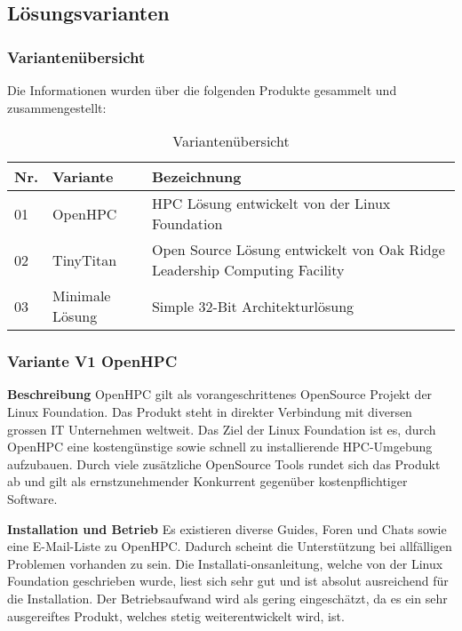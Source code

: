 
\subsection{Lösungsvarianten}
\subsubsection{Variantenübersicht}

Die Informationen wurden über die folgenden Produkte gesammelt und zusammengestellt:

\begin{table}[H]
\centering
\begin{tabular}{p{1cm}p{4cm}p{11cm}}
\hline
\rowcolor{heading} \textbf{Nr.} & \textbf{Variante} & \textbf{Bezeichnung} \\\hline
01 & OpenHPC & HPC Lösung entwickelt von der Linux Foundation \\\hline
02 & TinyTitan & Open Source Lösung entwickelt von Oak Ridge Leadership Computing Facility \\\hline
03 & Minimale Lösung & Simple 32-Bit Architekturlösung \\\hline
\end{tabular}
\caption{Variantenübersicht}
\end{table}

\subsubsection{Variante V1 \flqq OpenHPC\frqq}

\textbf{Beschreibung}\newline
OpenHPC gilt als vorangeschrittenes OpenSource Projekt der Linux Foundation. Das Produkt steht in direkter Verbindung mit diversen grossen IT Unternehmen weltweit. Das Ziel der Linux Foundation ist es, durch OpenHPC eine kostengünstige sowie schnell zu installierende HPC-Umgebung aufzubauen. Durch viele zusätzliche OpenSource Tools rundet sich das Produkt ab und gilt als ernstzunehmender Konkurrent gegenüber kostenpflichtiger Software.

\textbf{Installation und Betrieb}\newline
Es existieren diverse Guides, Foren und Chats sowie eine E-Mail-Liste zu OpenHPC. Dadurch scheint die Unterstützung bei allfälligen Problemen vorhanden zu sein. Die Installati-onsanleitung, welche von der Linux Foundation geschrieben wurde, liest sich sehr gut und ist absolut ausreichend für die Installation. Der Betriebsaufwand wird als gering eingeschätzt, da es ein sehr ausgereiftes Produkt, welches stetig weiterentwickelt wird, ist.


